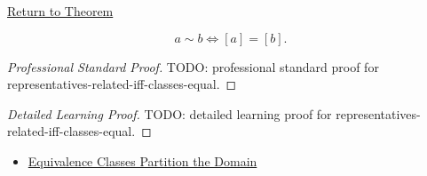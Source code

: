 \newpage
{}
\label{prf:representatives-related-iff-classes-equal}

\begin{remark*}[Return]
\hyperref[prop:representatives-related-iff-classes-equal]{Return to Theorem}
\end{remark*}

\begin{proposition*}
\[
a\sim b \Longleftrightarrow [a]=[b].
\]
\end{proposition*}

\begin{proof}[Professional Standard Proof]
\LRAProofBodyStart
TODO: professional standard proof for representatives-related-iff-classes-equal.
\end{proof}

\begin{proof}[Detailed Learning Proof]
\LRAProofBodyStart
TODO: detailed learning proof for representatives-related-iff-classes-equal.
\end{proof}

\begin{remark*}
\end{remark*}

\begin{dependencies}
\begin{itemize}
  \item \hyperref[thm:equivalence-classes-partition-domain]{Equivalence Classes Partition the Domain}
\end{itemize}
\end{dependencies}

\clearpage
